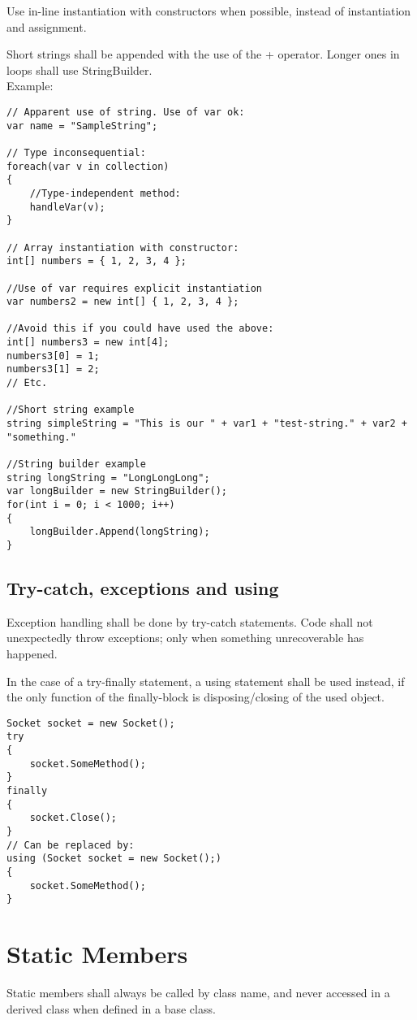Use in-line instantiation with constructors when possible, instead of instantiation and assignment.

Short strings shall be appended with the use of the + operator. Longer ones in loops shall use StringBuilder.\\

Example:
\begin{lstlisting}
// Apparent use of string. Use of var ok:
var name = "SampleString";

// Type inconsequential:
foreach(var v in collection)
{
	//Type-independent method:
	handleVar(v);
}

// Array instantiation with constructor:
int[] numbers = { 1, 2, 3, 4 };

//Use of var requires explicit instantiation
var numbers2 = new int[] { 1, 2, 3, 4 };

//Avoid this if you could have used the above:
int[] numbers3 = new int[4];
numbers3[0] = 1;
numbers3[1] = 2;
// Etc.

//Short string example
string simpleString = "This is our " + var1 + "test-string." + var2 + "something."

//String builder example
string longString = "LongLongLong";
var longBuilder = new StringBuilder();
for(int i = 0; i < 1000; i++)
{
	longBuilder.Append(longString);
}

\end{lstlisting}


\subsection{Try-catch, exceptions and using}
Exception handling shall be done by try-catch statements.
Code shall not unexpectedly throw exceptions; only when something unrecoverable has happened.

In the case of a try-finally statement, a using statement shall be used instead, if the only function of
the finally-block is disposing/closing of the used object.
\\
\begin{lstlisting}
Socket socket = new Socket();
try
{
	socket.SomeMethod();
}
finally
{
	socket.Close();
}
// Can be replaced by:
using (Socket socket = new Socket();)
{
	socket.SomeMethod();
}
\end{lstlisting}

\section{Static Members}
Static members shall always be called by class name, and never accessed in a derived class when defined in a base class.

